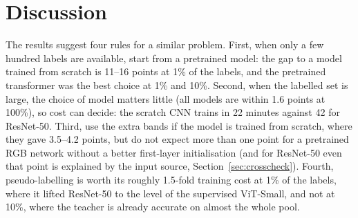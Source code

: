 \documentclass[twoside,a4paper,11pt]{article}
\newcommand{\tabdir}{tables}
\begin{document}


\section{Discussion}\label{sec:discussion}
The results suggest four rules for a similar problem. First, when only a few hundred labels are available, start from a pretrained model: the gap to a model trained from scratch is 11--16 points at 1\% of the labels, and the pretrained transformer was the best choice at 1\% and 10\%. Second, when the labelled set is large, the choice of model matters little (all models are within 1.6 points at 100\%), so cost can decide: the scratch CNN trains in 22 minutes against 42 for ResNet-50. Third, use the extra bands if the model is trained from scratch, where they gave 3.5--4.2 points, but do not expect more than one point for a pretrained RGB network without a better first-layer initialisation (and for ResNet-50 even that point is explained by the input source, Section~\ref{sec:crosscheck}). Fourth, pseudo-labelling is worth its roughly 1.5-fold training cost at 1\% of the labels, where it lifted ResNet-50 to the level of the supervised ViT-Small, and not at 10\%, where the teacher is already accurate on almost the whole pool.
\end{document}
